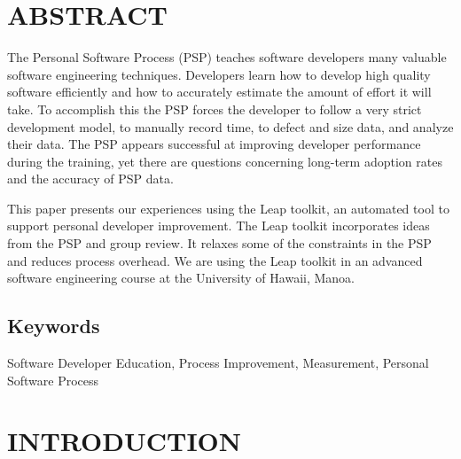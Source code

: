 
\pagestyle{plain}



\section*{ABSTRACT}
The Personal Software Process (PSP) teaches software developers many valuable
software engineering techniques.  Developers learn how to develop high quality
software efficiently and how to accurately estimate the amount of effort it will
take. To accomplish this the PSP forces the developer to follow a very strict
development model, to manually record time, to defect and size data, and analyze
their data.  The PSP appears successful at improving developer performance during
the training, yet there are questions concerning long-term adoption rates and
the accuracy of PSP data.

This paper presents our experiences using the Leap toolkit, an automated tool
to support personal developer improvement.  The Leap toolkit incorporates ideas
from the PSP and group review.  It relaxes some of the constraints in the PSP
and reduces process overhead.  We are using the Leap toolkit in an advanced
software engineering course at the University of Hawaii, Manoa.

\subsection{Keywords}
Software Developer Education, Process Improvement, Measurement, Personal Software Process

\section{INTRODUCTION}

